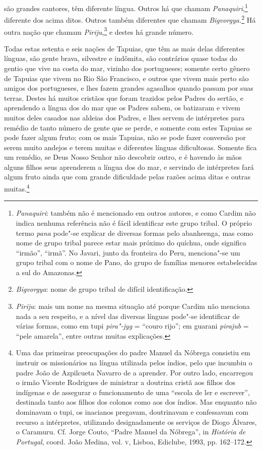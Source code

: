 são grandes cantores, têm diferente língua. Outros há que chamam
\textit{Panaquiri},\footnote{ \textit{Panaquiri}: também não é
mencionado em outros autores, e como Cardim não indica nenhuma
referência não é fácil identificar este grupo tribal. O próprio termo
\textit{pana} pode"-se explicar de diversas formas pelo abanheenga,
mas como nome de grupo tribal parece estar mais próximo do quíchua,
onde significa ``irmão'', ``irmã''. No Javari, junto da fronteira do Peru,
menciona"-se um grupo tribal com o nome de Pano, do grupo de famílias
menores estabelecidas a sul do Amazonas.} diferente dos acima ditos.
Outros também diferentes que chamam 
\textit{Bigvorgya.}\footnote{ \textit{Bigvorgya}: nome de grupo tribal de difícil
identificação.} Há outra nação que chamam 
\textit{Piriju},\footnote{ \textit{Piriju}: mais um nome na mesma situação até porque
Cardim não menciona nada a seu respeito, e a nível das diversas línguas
pode"-se identificar de várias formas, como em tupi \textit{pira"-jyg} = 
``couro rijo''; em guarani \textit{pirajub} = ``pele amarela'', entre
outras muitas explicações.} e destes há grande número. 

 Todas estas setenta e seis nações de Tapuias, que têm as mais delas
diferentes línguas, são gente brava, silvestre e indômita, são
contrários quase todas do gentio que vive na costa do mar, vizinho dos
portugueses; somente certo gênero de Tapuias que vivem no Rio São
Francisco, e outros que vivem mais perto são amigos dos portugueses, e
lhes fazem grandes agasalhos quando passam por suas terras. Destes há
muitos cristãos que foram trazidos pelos Padres do sertão, e aprendendo
a língua dos do mar que os Padres sabem, os batizaram e vivem muitos
deles casados nas aldeias dos Padres, e lhes servem de intérpretes para
remédio de tanto número de gente que se perde, e somente com estes
Tapuias se pode fazer algum fruto; com os mais Tapuias, não se pode
fazer conversão por serem muito andejos e terem muitas e diferentes
línguas dificultosas. Somente fica um remédio, se Deus Nosso Senhor não
descobrir outro, e é havendo às mãos alguns filhos seus aprenderem a
língua dos do mar, e servindo de intérpretes fará algum fruto ainda que
com grande dificuldade pelas razões acima ditas e outras 
muitas.\footnote{ Uma das primeiras preocupações do padre Manuel da
Nóbrega consistiu em instruir os missionários na língua utilizada pelos
índios, pelo que incumbiu o padre João de Azpilcueta Navarro de a
aprender. Por outro lado, encarregou o irmão Vicente Rodrigues de
ministrar a doutrina cristã aos filhos dos indígenas e de assegurar o
funcionamento de uma ``escola de ler e escrever'', destinada tanto aos
filhos dos colonos como aos dos índios. Mas enquanto não dominavam o
tupi, os inacianos pregavam, doutrinavam e confessavam com recurso a
intérpretes, utilizando designadamente os serviços de Diogo Álvares, o
Caramuru. Cf. Jorge Couto, ``Padre Manuel da Nóbrega'', in
\textit{História de Portugal}, coord. João Medina, vol. \textsc{v}, Lisboa,
Ediclube, 1993, pp. 162--172.} 

